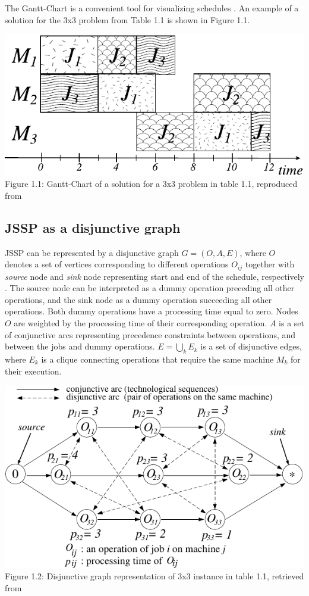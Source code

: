 The Gantt-Chart is a convenient tool for visualizing schedules \cite{WILSON2003430}. An example of a solution for the 3x3 problem from Table 1.1 is shown in Figure 1.1.
\begin{center}
    \includegraphics[width=0.8\linewidth]{images/gantt-charrt.pdf}\\
    Figure 1.1: Gantt-Chart of a solution for a 3x3 problem in table 1.1, reproduced from \cite{YamadaNakanoJSSP}
\end{center}

\subsection{JSSP as a disjunctive graph} \label{JSSP as a disjunctive graph}

JSSP can be represented by a disjunctive graph $G = ( O, A, E )$, where $O$ denotes a set of vertices corresponding to different operations $O_{ij}$ together with \textit{source} node and \textit{sink} node representing start and end of the schedule, respectively \cite{YamadaNakanoJSSP, BLAZEWICZ2000317}. The source node can be interpreted as a dummy operation preceding all other operations, and the sink node as a dummy operation succeeding all other operations. Both dummy operations have a processing time equal to zero. Nodes $O$ are weighted by the processing time of their corresponding operation. $A$ is a set of conjunctive arcs representing precedence constraints between operations, and between the jobs and dummy operations. $E = \bigcup_{k} E_k$ is a set of disjunctive edges, where $E_k$ is a clique connecting operations that require the same machine $M_k$ for their execution.
\begin{center}
    \includegraphics[width=0.75\linewidth]{images/jssp_disjunctive_graph.pdf}\\
    Figure 1.2: Disjunctive graph representation of 3x3 instance in table 1.1, retrieved from \cite{YamadaNakanoJSSP}
\end{center}


